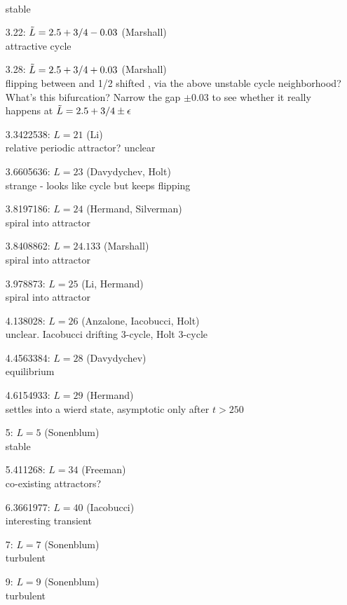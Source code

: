 \documentclass[letterpaper,10pt,fleqn,notitlepage]{article}
\begin{document}
\begin{itemize}
        \\stable {}
\item[3.22:] $ \tilde{L} = 2.5+3/4-0.03$ (Marshall)
       \\ attractive cycle
\item[3.28:] $ \tilde{L} = 2.5+3/4+0.03$ (Marshall)
       \\ flipping between  and 1/2 shifted ,
        via the above unstable cycle neighborhood?
        What's this bifurcation? Narrow the gap $\pm 0.03$
        to see whether it really happens at
        $ \tilde{L} = 2.5+3/4 \pm \epsilon$
\item[3.3422538:] $L = 21$ (Li)
        \\ relative periodic attractor? unclear
\item[3.6605636:] $L = 23$ (Davydychev, Holt)
        \\ strange - looks like cycle but keeps flipping
\item[3.8197186:] $L = 24$ (Hermand, Silverman)
        \\ spiral into  attractor
\item[3.8408862:] $L = 24.133$ (Marshall)
        \\ spiral into  attractor
\item[3.978873:] $L = 25$ (Li, Hermand)
        \\ spiral into  attractor
\item[4.138028:] $L = 26$ (Anzalone, Iacobucci, Holt)
        \\ unclear. Iacobucci drifting 3-cycle,  Holt 3-cycle
\item[4.4563384:] $L = 28$ (Davydychev)
        \\equilibrium
\item[4.6154933:] $L = 29$ (Hermand)
        \\settles into a wierd state, asymptotic only after $t>250$
\item[5:] $L = 5$ (Sonenblum)
        \\ stable 
\item[5.411268:] $L = 34$ (Freeman)
       \\ co-existing attractors?
\item[6.3661977:] $L = 40$ (Iacobucci)
       \\ interesting transient
\item[7:] $L = 7$ (Sonenblum)
        \\ turbulent
\item[9:] $L = 9$ (Sonenblum)
        \\ turbulent


\end{itemize}
\end{document}
